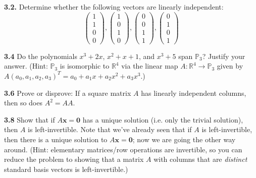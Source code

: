\documentclass{article}
\begin{document}
\textbf{3.2.} Determine whether the following vectors are linearly independent:
\[
\begin{pmatrix} 1 \\ 1 \\ 0 \\0 \end{pmatrix},
\begin{pmatrix} 1 \\ 0 \\ 1 \\0 \end{pmatrix}, 
\begin{pmatrix} 0 \\ 0 \\ 1 \\1 \end{pmatrix},
\begin{pmatrix} 0 \\ 1 \\ 0 \\1 \end{pmatrix} \]


\textbf{3.4} Do the polynomials $x^3 + 2x$, $x^2 + x + 1$, and $x^3 + 5$ span $\mathbb{P}_3$? Justify your answer. (Hint: $\mathbb{P}_3$ is isomorphic to $\mathbb{R}^4$ via the linear map $A: \mathbb{R}^4 \to \mathbb{P}_3$ given by $A(a_0, a_1, a_2, a_3)^T = a_0 + a_1 x + a_2 x^2 + a_3 x^3$.)

\textbf{3.6} Prove or disprove: If a square matrix $A$ has linearly independent columns, then so does $A^2 = A A$.

\textbf{3.8} Show that if $A \mathbf{x} = \mathbf{0}$ has a unique solution (i.e. only the trivial solution), then $A$ is left-invertible. Note that we've already seen that if $A$ is left-invertible, then there is a unique solution to $A \mathbf{x} = \mathbf{0}$; now we are going the other way around. (Hint: elementary matrices/row operations are invertible, so you can reduce the problem to showing that a matrix $A$ with columns that are \emph{distinct} standard basis vectors is left-invertible.)
\end{document}
